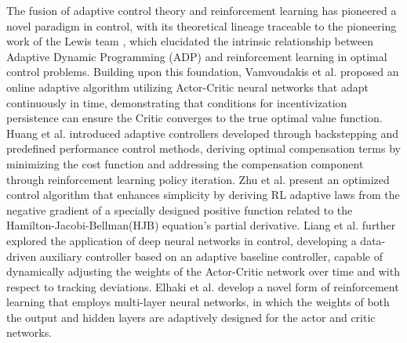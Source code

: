 \documentclass[preprint,12pt]{elsarticle}
\begin{document}
The fusion of adaptive control theory and reinforcement learning has pioneered a novel paradigm in control, with its theoretical lineage traceable to the pioneering work of the Lewis team \cite{5227780}, which elucidated the intrinsic relationship between Adaptive Dynamic Programming (ADP) and reinforcement learning in optimal control problems. Building upon this foundation, Vamvoudakis et al. \cite{VAMVOUDAKIS2010878} proposed an online adaptive algorithm utilizing Actor-Critic neural networks that adapt continuously in time, demonstrating that conditions for incentivization persistence can ensure the Critic converges to the true optimal value function. Huang et al. \cite{HUANG2023407} introduced adaptive controllers developed through backstepping and predefined performance control methods, deriving optimal compensation terms by minimizing the cost function and addressing the compensation component through reinforcement learning policy iteration. Zhu et al.\cite{ZHU2024106693} present an optimized control algorithm that enhances simplicity by deriving RL adaptive laws from the negative gradient of a specially designed positive function related to the Hamilton-Jacobi-Bellman(HJB) equation's partial derivative. Liang et al. \cite{10124235} further explored the application of deep neural networks in control, developing a data-driven auxiliary controller based on an adaptive baseline controller, capable of dynamically adjusting the weights of the Actor-Critic network over time and with respect to tracking deviations. Elhaki et al. \cite{ELHAKI202314237} develop a novel form of reinforcement learning that employs multi-layer neural networks, in which the weights of both the output and hidden layers are adaptively designed for the actor and critic networks.

\end{document}
